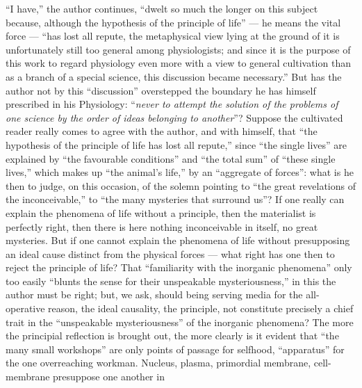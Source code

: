 \documentclass[12pt,a4paper]{book}
\begin{document}
{``I have,'' the author continues, ``dwelt so much the longer on this subject
because, although the hypothesis of the principle of life'' --- he means the
vital force --- ``has lost all repute, the metaphysical view lying at the
ground of it is unfortunately still too general among physiologists; and since
it is the purpose of this work to regard physiology even more with a view to
general cultivation than as a branch of a special science, this discussion
became necessary.''
But has the author not by this ``discussion'' overstepped the boundary he has
himself prescribed in his Physiology: ``\emph{never to attempt the solution of
the problems of one science by the order of ideas belonging to another}''?
Suppose
the cultivated reader really comes to agree with the author, and with himself,
that ``the hypothesis of the principle of life has lost all repute,'' since
``the single lives'' are explained by ``the favourable conditions'' and ``the
total sum'' of ``these single lives,'' which makes up ``the animal's life,'' by
an ``aggregate of forces'': what is he then to judge, on this occasion, of the
solemn pointing to ``the great revelations of the inconceivable,'' to ``the
many mysteries that surround us''? If one really can explain the phenomena of
life without a principle, then the materialist is perfectly right, then there
is here nothing inconceivable in itself, no great mysteries. But if one cannot
explain the phenomena of life without presupposing an ideal cause distinct from
the physical forces --- what right has one then to reject the principle of
life? That ``familiarity with the inorganic phenomena'' only too easily ``blunts
the sense for their unspeakable mysteriousness,'' in this the author must be
right; but, we ask, should being serving media for the all-operative reason,
the ideal causality, the principle, not constitute precisely a chief trait in
the ``unspeakable mysteriousness'' of the inorganic phenomena?}
The more the principial reflection is brought out, the more clearly is it
evident that ``the many small workshops'' are only
points of passage for selfhood, ``apparatus'' for the one overreaching workman.
Nucleus, plasma, primordial membrane, cell-membrane presuppose one another in
\end{document}
